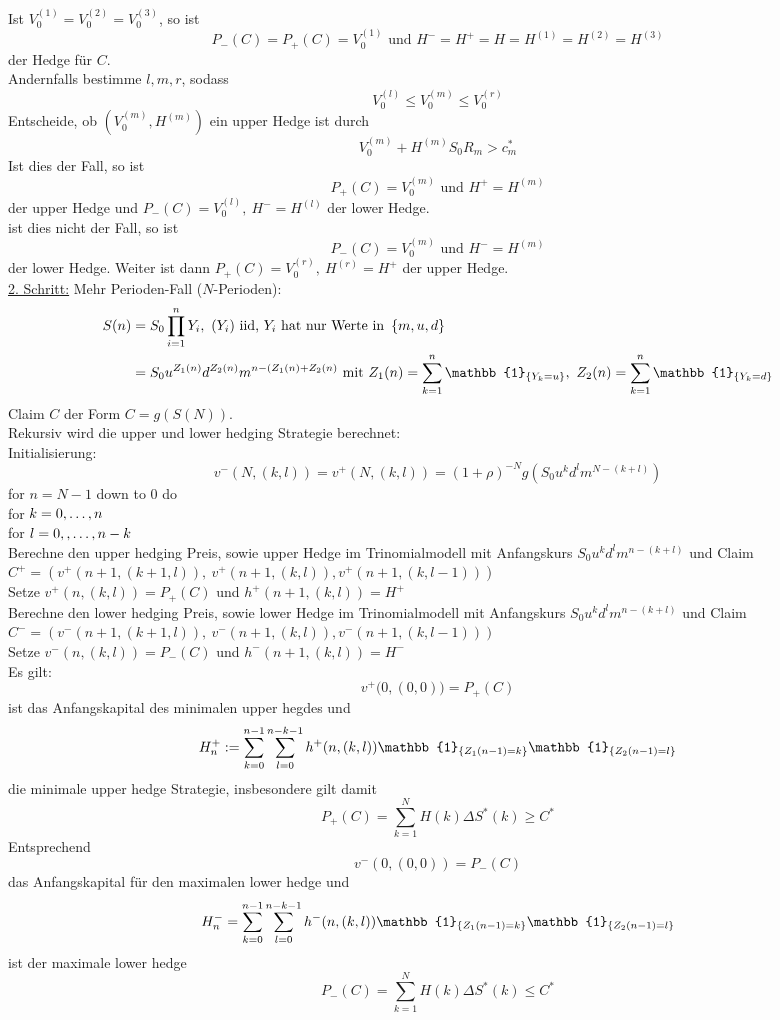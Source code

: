 Ist $V_0^{(1)}=V_0^{(2)}=V_0^{(3)}$, so ist 
\[
P_-(C)=P_+(C)=V_0^{(1)}\text{ und }H^-=H^+=H=H^{(1)}=H^{(2)}=H^{(3)}
\]
der Hedge für $C$.\\
Andernfalls bestimme $l,m,r$, sodass
\[
V_0^{(l)}\le V_0^{(m)}\le V_0^{(r)}
\]
Entscheide, ob $(V_0^{(m)},H^{(m)})$ ein upper Hedge ist durch
\[
V_0^{(m)}+H^{(m)}S_0R_m>c_m^*
\]
Ist dies der Fall, so ist
\[
P_+(C)=V_0^{(m)}\text{ und }H^+=H^{(m)}
\]
der upper Hedge und $P_-(C)=V_0^{(l)},~H^-=H^{(l)}$ der lower Hedge.\\
ist dies nicht der Fall, so ist
\[
P_-(C)=V_0^{(m)}\text{ und }H^-=H^{(m)}
\]
der lower Hedge.
Weiter ist dann $P_+(C)=V_0^{(r)},~H^{(r)}=H^+$ der upper Hedge.\\

\uline{2. Schritt:} Mehr Perioden-Fall ($N$-Perioden):
\begin{equation*}
\begin{aligned}
	S(n)&=S_0\prod_{i=1}^{n}Y_i,~(Y_i)\text{ iid, }Y_i\text{ hat nur Werte in }\penbrace{m,u,d}\\
	&= S_0u^{Z_1(n)}d^{Z_2(n)}m^{n-(Z_1(n)+Z_2(n)}\text{ mit }Z_1(n)=\sum_{k=1}^{n}\mathbb{1}_{\penbrace{Y_k=u}},~ Z_2(n)=\sum_{k=1}^{n}\mathbb{1}_{\penbrace{Y_k=d}}
\end{aligned}
\end{equation*}
Claim $C$ der Form $C=g(S(N))$.\\
Rekursiv wird die upper und lower hedging Strategie berechnet:\\
Initialisierung:
\[
v^-(N,(k,l))=v^+(N,(k,l))=(1+\rho)^{-N}g(S_0u^kd^lm^{N-(k+l)})
\]
for $n=N-1$ down to 0 do\\
	for $k=0, \dots ,n$\\
	for $l=0,, \dots ,n-k$\\
	Berechne den upper hedging Preis, sowie upper Hedge im Trinomialmodell mit Anfangskurs $S_0u^kd^lm^{n-(k+l)}$ und Claim $C^+=(v^+(n+1,(k+1,l)),~v^+(n+1,(k,l)),v^+(n+1,(k,l-1)))$\\
	Setze $v^+(n,(k,l))=P_+(C)$ und $h^+(n+1,(k,l))=H^+$\\
	Berechne den lower hedging Preis, sowie lower Hedge im Trinomialmodell mit Anfangskurs $S_0u^kd^lm^{n-(k+l)}$ und Claim $C^-=(v^-(n+1,(k+1,l)),~v^-(n+1,(k,l)),v^-(n+1,(k,l-1)))$\\
	Setze $v^-(n,(k,l))=P_-(C)$ und $h^-(n+1,(k,l))=H^-$\\

Es gilt:
\[
v^+\big(0,(0,0)\big)=P_+(C)
\]
ist das Anfangskapital des minimalen upper hegdes und 
\[
H_n^+:=\sum_{k=0}^{n-1}\sum_{l=0}^{n-k-1}h^+(n,(k,l))\mathbb{1}_{\penbrace{Z_1(n-1)=k}}\mathbb{1}_{\penbrace{Z_2(n-1)=l}}
\]
die minimale upper hedge Strategie, insbesondere gilt damit
\[
P_+(C)=\sum_{k=1}^{N}H(k)\Delta S^*(k)\ge C^*
\]
Entsprechend
\[
v^-(0,(0,0))=P_-(C)
\]
das Anfangskapital für den maximalen lower hedge und
\[
H_n^-=\sum_{k=0}^{n-1}\sum_{l=0}^{n-k-1}h^-(n,(k,l))\mathbb{1}_{\penbrace{Z_1(n-1)=k}}\mathbb{1}_{\penbrace{Z_2(n-1)=l}}
\]
ist der maximale lower hedge
\[
P_-(C)=\sum_{k=1}^{N}H(k)\Delta S^*(k)\le C^*
\]


